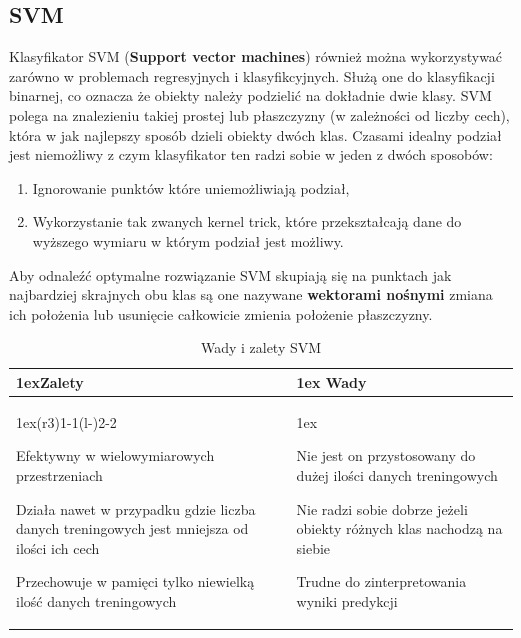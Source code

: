 \subsection{SVM}

Klasyfikator SVM (\textbf{Support vector machines}) również można wykorzystywać zarówno 
w problemach regresyjnych i klasyfikcyjnych. Służą one do klasyfikacji binarnej, co 
oznacza że obiekty należy podzielić na dokładnie dwie klasy. SVM polega na znalezieniu
takiej prostej lub płaszczyzny (w zależności od liczby cech), która w jak najlepszy sposób
dzieli obiekty dwóch klas. Czasami idealny podział jest niemożliwy z czym klasyfikator 
ten radzi sobie w jeden z dwóch sposobów:
\begin{enumerate}
    \item Ignorowanie punktów które uniemożliwiają podział,
    \item Wykorzystanie tak zwanych kernel trick, które przekształcają dane do wyższego 
    wymiaru w którym podział jest możliwy.
\end{enumerate}
Aby odnaleźć optymalne rozwiązanie SVM skupiają się na punktach jak najbardziej skrajnych
obu klas są one nazywane \textbf{wektorami nośnymi} zmiana ich położenia lub usunięcie
całkowicie zmienia położenie płaszczyzny.

\begin{table}[h]
    \begin{tabularx}{\linewidth}{>{\parskip1ex}X@{\kern4\tabcolsep}>{\parskip1ex}X}
    \toprule
    \hfil\bfseries Zalety
    &
    \hfil\bfseries Wady
    \\\cmidrule(r{3\tabcolsep}){1-1}\cmidrule(l{-\tabcolsep}){2-2}
    
    Efektywny w wielowymiarowych przestrzeniach\par
    Działa nawet w przypadku gdzie liczba danych treningowych jest mniejsza od
    ilości ich cech\par
    Przechowuje w pamięci tylko niewielką ilość danych treningowych\par
    
    &
    
    Nie jest on przystosowany do dużej ilości danych treningowych\par
    Nie radzi sobie dobrze jeżeli obiekty różnych klas nachodzą na siebie\par
    Trudne do zinterpretowania wyniki predykcji
    
    \\\bottomrule
    \end{tabularx}
    \caption{Wady i zalety SVM}
\end{table}

